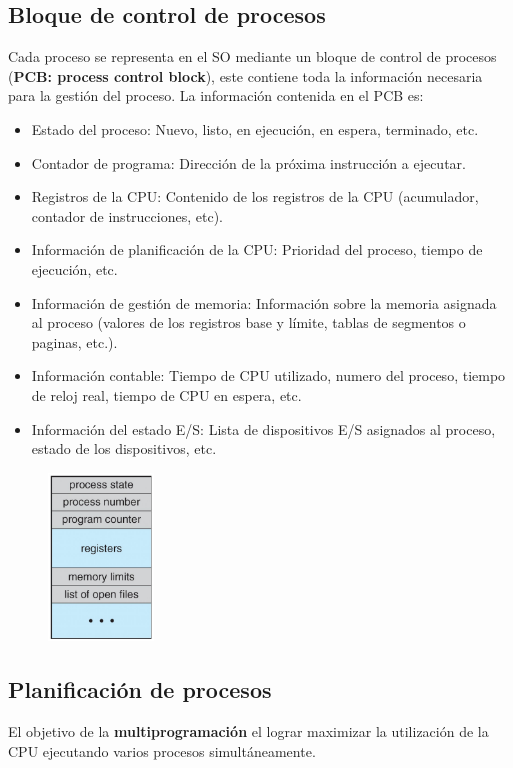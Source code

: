 \documentclass{templateNote}
\begin{document}
\subsection*{Bloque de control de procesos}
Cada proceso se representa en el SO mediante un bloque de control de procesos (\textbf{PCB: process control block}), este contiene toda la información necesaria para la gestión del proceso. La información contenida en el PCB es:
\begin{itemize}
    \item Estado del proceso: Nuevo, listo, en ejecución, en espera, terminado, etc.
    \item Contador de programa: Dirección de la próxima instrucción a ejecutar.
    \item Registros de la CPU: Contenido de los registros de la CPU (acumulador, contador de instrucciones, etc).
    \item Información de planificación de la CPU: Prioridad del proceso, tiempo de ejecución, etc.
    \item Información de gestión de memoria: Información sobre la memoria asignada al proceso (valores de los registros base y límite, tablas de segmentos o paginas, etc.).
    \item Información contable: Tiempo de CPU utilizado, numero del proceso, tiempo de reloj real, tiempo de CPU en espera, etc.
    \item Información del estado E/S: Lista de dispositivos E/S asignados al proceso, estado de los dispositivos, etc.
\end{itemize}

\begin{figure}[H]
    \centering
    \includegraphics[width=0.25\textwidth]{img/pcb.png}
\end{figure}

\subsection*{Planificación de procesos}
El objetivo de la \textbf{multiprogramación} el lograr maximizar la utilización de la CPU ejecutando varios procesos simultáneamente. 
\end{document}
